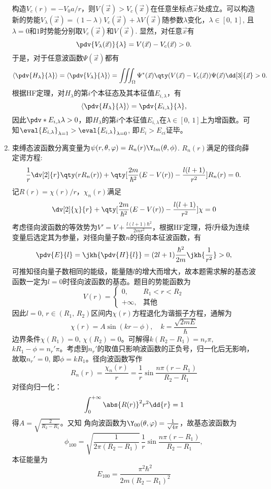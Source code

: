 \begin{enumerate}[label=\textbf{5.\arabic*}, listparindent=\parindent]
构造$V_c(r) = -V_0 a/r$，则$V(\vec{x})>V_c(\vec{x})$在任意坐标点$\vec{x}$处成立。可以构造新的势能$V_{\lambda}(\vec{x}) = (1-\lambda) V_c(\vec{x}) + \lambda V(\vec{x})$随参数$\lambda$变化，$\lambda\in[0,\,1]$, 且$\lambda=0$和$1$时势能分别取$V_c(\vec{x})$和$V(\vec{x})$. 显然，对任意$\vec{x}$有
\[\pdv{V_\lambda(\vec{x})}{\lambda} = V(\vec{x})-V_c(\vec{x})>0.\]
于是，对于任意波函数$\Psi(\vec{x})$都有
\[\left\langle \pdv{H_\lambda}{\lambda}\right\rangle = \left\langle \pdv{V_\lambda}{\lambda}\right\rangle = \iiint_\Omega \Psi^*(\vec{x})\qty(V(\vec{x})-V_c(\vec{x}))\Psi(\vec{x})\dd[3]{\vec{x}}>0.\]
根据HF定理，对$H_\lambda$的第$i$个本征态及其本征值$E_{i,\lambda}$，有
\[\left\langle \pdv{H_\lambda}{\lambda}\right\rangle = \pdv{E_{i,\lambda}}{\lambda},\]
因此$\pdv*{E_{i,\lambda}}{\lambda}>0$，即$H_{\lambda}$的第$i$个本征值$E_{i,\lambda}$在$\lambda\in [0,\,1]$上为增函数。可知$\eval{E_{i,\lambda}}_{\lambda=1}>\eval{E_{i,\lambda}}_{\lambda=0}$, 即$E_i>E_{ci} $证毕。

\item 束缚态波函数分离变量为$\psi(r,\theta,\varphi)=R_n(r)\Y_{lm}(\theta,\phi)$. $R_n(r)$满足的径向薛定谔方程:
\[\frac{1}{r}\dv[2]{r}\qty(rR_n(r)) + \qty[\frac{2m}{\hbar^2}(E-V(r))-\frac{l(l+1)}{r^2}]R_n(r) = 0.\]
记$R(r)=\chi(r)/r$，$\chi_n(r)$满足
\[\dv[2]{\chi}{r}+\qty[\frac{2m}{\hbar^2}(E-V(r))-\frac{l(l+1)}{r^2}]\chi = 0\]
考虑径向波函数的等效势为$V'=V+\frac{l(l+1)\hbar^2}{2mr^2}$，根据HF定理，将$l$升级为连续变量后选定其为参量，对径向量子数$n$的径向本征波函数，有
\[\pdv{E}{l}=\jkh{\pdv{H}{l}} = (2l+1)\frac{\hbar^2}{2m}\jkh{\frac{1}{r^2}}>0,\] 可推知径向量子数相同的能级，能量随$l$的增大而增大，故本题需求解的基态波函数一定为$l=0$时径向波函数的基态。题目的势能函数为
\[V(r) = \begin{cases}0, & R_1<r<R_2\\
+\infty, &\text{其他}
\end{cases}\]
因此$l=0$, $r\in(R_1,\,R_2)$区间内$\chi(r)$方程退化为谐振子方程，通解为
\[\chi(r) = A\sin(kr-\phi),\quad k=\frac{\sqrt{2mE}}{\hbar}\]
边界条件$\chi(R_1)=0$, $\chi(R_2)=0$。可解得$k(R_2-R_1)=n_r\pi$, $kR_1-\phi=n_r'\pi$。考虑到$n_r'$的取值只影响波函数的正负号，归一化后无影响，故取$n_r'=0$, 即$\phi=kR_1$。径向波函数写作
\[R_n(r) = \frac{\chi_n(r)}{r} = \frac{1}{r}\sin\frac{n\pi (r-R_1)}{R_2-R_1}\]
对径向归一化：
\[\int_0^{+\infty} \abs{R(r)}^2r^2\dd{r} = 1\]
得$A=\sqrt{\frac{2}{R_2-R_1}}$。又知
角向波函数为$\Y_{00}(\theta,\varphi)=\frac{1}{\sqrt{4\pi}}$，故基态波函数为
\[\phi_{100}=\sqrt{\frac{1}{2\pi(R_2-R_1)}}\,\frac{1}{r}\sin\frac{n\pi(r-R_1)}{R_2-R_1},\]
本征能量为
\[E_{100} = \frac{\pi^2\hbar^2}{2m(R_2-R_1)^2}\]


\end{enumerate}
